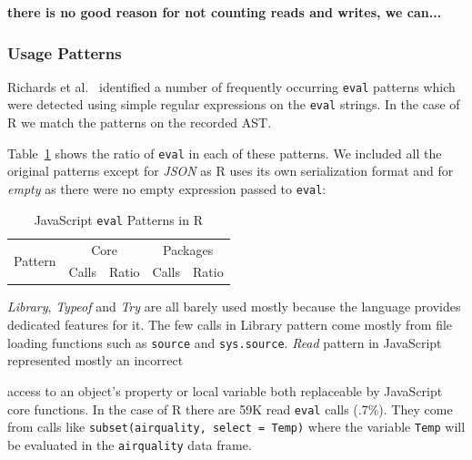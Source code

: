 \documentclass[USenglish,cleveref, autoref, thm-restate]{lipics-v2019}
\newcommand{\PatternReadRnd}{59K\xspace}
\newcommand{\PatternReadRatio}{.7\%\xspace}
\newcommand{\eval}{\texttt{eval}\xspace}
\renewcommand{\c}[1]{\lstinline{#1}\xspace}
\begin{document}
{\bf there is no good reason for not counting reads and writes, we can...}





\subsubsection{Usage Patterns}

Richards et al.~\cite{ecoop11} identified a number of frequently occurring \eval
patterns which were detected using simple regular expressions on the \eval
strings. In the case of R we match the patterns on the recorded AST.

Table~\ref{table:js-pattens-in-r} shows the ratio of \eval in each of these
patterns. We included all the original patterns except for \emph{JSON} as R uses
its own serialization format and for \emph{empty} as there were no empty expression
passed to \eval:

\begin{table}[ht]%
  \centering
\begin{tabular}{r|r|r|r|r}\hline
\multirow{2}{*}{Pattern} & \multicolumn{2}{c|}{Core} & \multicolumn{2}{c}{Packages} \\
                         & Calls & Ratio            & Calls & Ratio \\\hline

\end{tabular}
\caption{JavaScript \eval Patterns in R}
\label{table:js-pattens-in-r}
\end{table}


\noindent \emph{Library}, \emph{Typeof} and \emph{Try} are all barely used
mostly because the language provides dedicated features for it. The few calls in
Library pattern come mostly from file loading functions such as \c{source} and
\c{sys.source}.
%
\noindent \emph{Read} pattern in JavaScript represented mostly an incorrect

access to an object's property or local variable both replaceable by
JavaScript core functions. In the case of R there are \PatternReadRnd read
\eval calls (\PatternReadRatio). They come from calls like
\c{subset(airquality, select = Temp)} where the variable \c{Temp} will be
evaluated in the \c{airquality} data frame.
\end{document}
